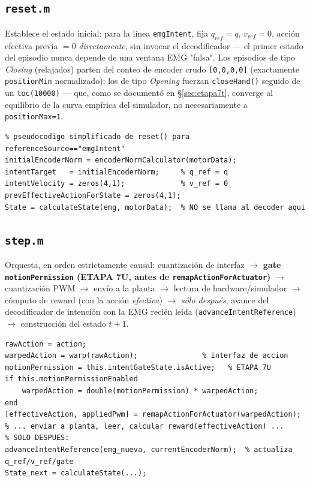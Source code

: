 \documentclass[11pt,a4paper]{article}
\begin{document}
\subsection{\texttt{reset.m}}
Establece el estado inicial: para la línea \texttt{emgIntent}, fija
$q_{ref}=q$, $v_{ref}=0$, acción efectiva previa $=0$ \emph{directamente}, sin invocar
el decodificador --- el primer estado del episodio nunca depende de una ventana EMG
"falsa". Los episodios de tipo \emph{Closing} (relajados) parten del conteo de encoder
crudo \texttt{[0,0,0,0]} (exactamente \texttt{positionMin} normalizado); los de tipo
\emph{Opening} fuerzan \texttt{closeHand()} seguido de un \texttt{toc(10000)} --- que,
como se documentó en \S\ref{sec:etapa7t}, converge al equilibrio de la curva empírica
del simulador, no necesariamente a \texttt{positionMax=1}.

\begin{lstlisting}
% pseudocodigo simplificado de reset() para referenceSource=="emgIntent"
initialEncoderNorm = encoderNormCalculator(motorData);
intentTarget   = initialEncoderNorm;     % q_ref = q
intentVelocity = zeros(4,1);             % v_ref = 0
prevEffectiveActionForState = zeros(4,1);
State = calculateState(emg, motorData);  % NO se llama al decoder aqui
\end{lstlisting}

\subsection{\texttt{step.m}}
Orquesta, en orden estrictamente causal: cuantización de interfaz $\to$
\textbf{gate \texttt{motionPermission} (ETAPA 7U, antes de \texttt{remapActionForActuator})}
$\to$ cuantización PWM $\to$ envío a la planta $\to$ lectura de hardware/simulador
$\to$ cómputo de reward (con la acción \emph{efectiva}) $\to$ \emph{sólo después},
avance del decodificador de intención con la EMG recién leída (\texttt{advanceIntentReference})
$\to$ construcción del estado $t+1$.

\begin{lstlisting}
rawAction = action;
warpedAction = warp(rawAction);               % interfaz de accion
motionPermission = this.intentGateState.isActive;   % ETAPA 7U
if this.motionPermissionEnabled
    warpedAction = double(motionPermission) * warpedAction;
end
[effectiveAction, appliedPwm] = remapActionForActuator(warpedAction);
% ... enviar a planta, leer, calcular reward(effectiveAction) ...
% SOLO DESPUES:
advanceIntentReference(emg_nueva, currentEncoderNorm);  % actualiza q_ref/v_ref/gate
State_next = calculateState(...);
\end{lstlisting}
\end{document}
